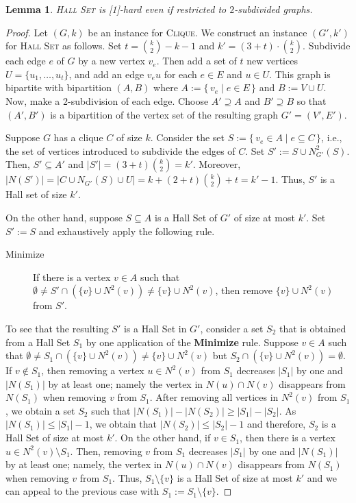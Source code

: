 \documentclass[10pt,usletter]{article}
\newcommand{\SB}{\{\,}\newcommand{\SM}{\;{|}\;}\newcommand{\SE}{\,\}}
\newcommand{\W}[1][xxxx]{\text{\normalfont W}[#1]}
\newcommand{\HS}{\textsc{Hall Set}\xspace}
\newcommand{\CLIQUE}{\textsc{Clique}\xspace}
\newtheorem{lemma}[theorem]{Lemma}
\begin{document}
\begin{lemma}\label{lem:h2}
 \HS is {\rm \W[1]}-hard even if restricted to $2$-subdivided graphs. \end{lemma}
\begin{proof}
Let $(G,k)$ be an instance for \CLIQUE. We construct an instance $(G',k')$ for \HS as follows.
Set $t=\binom{k}{2}-k-1$ and $k'=(3+t) \cdot \binom{k}{2}$.
Subdivide each edge $e$ of $G$ by a new vertex $v_e$. Then add a set of $t$ new vertices $U=\{u_1, \dots, u_t\}$,
and add an edge $v_eu$ for each $e\in E$ and $u\in U$. This graph is bipartite with bipartition $(A,B)$ where
$A:=\SB v_e \SM e\in E\SE$ and $B:=V\cup U$. Now, make a 2-subdivision of each edge.
Choose $A'\supseteq A$ and $B'\supseteq B$ so that $(A',B')$ is a bipartition of the vertex set of the resulting graph $G'=(V',E')$.

Suppose $G$ has a clique $C$ of size $k$. Consider the set $S := \SB
v_e\in A \SM e \subseteq C \SE$, i.e., the set of vertices introduced
to subdivide the edges of $C$. Set $S' := S\cup N^2_{G'}(S)$. Then, $S' \subseteq A'$ and $|S'| = (3+t)\binom{k}{2} = k'$.
Moreover, $|N(S')| = |C \cup N_{G'}(S) \cup U| = k+(2+t) \binom{k}{2}+t = k'-1$. Thus, $S'$ is a
Hall set of size $k'$.

\smallskip

On the other hand, suppose $S \subseteq A$ is a Hall Set of $G'$ of size at most $k'$.
Set $S':=S$ and exhaustively apply the following rule.

\begin{description}
\item[Minimize] If there is a vertex $v\in A$ such that $\emptyset \neq S' \cap (\{v\}\cup N^2(v)) \neq \{v\}\cup N^2(v)$,
 then remove $\{v\}\cup N^2(v)$ from $S'$.
\end{description}

To see that the resulting $S'$ is a Hall Set in $G'$, consider a set $S_2$ that is obtained from a Hall Set $S_1$ by one application
of the \textbf{Minimize} rule. Suppose $v\in A$ such that $\emptyset \neq S_1 \cap (\{v\}\cup N^2(v)) \neq \{v\}\cup N^2(v)$ but
$S_2 \cap (\{v\}\cup N^2(v)) = \emptyset$. If $v\notin S_1$, then removing a vertex $u\in N^2(v)$ from $S_1$
decreases $|S_1|$ by one and $|N(S_1)|$ by at least one; namely the vertex in $N(u)\cap N(v)$ disappears from
$N(S_1)$ when removing $v$ from $S_1$. After removing all vertices in $N^2(v)$ from $S_1$, we obtain a set $S_2$
such that $|N(S_1)|-|N(S_2)| \ge |S_1|-|S_2|$. As $|N(S_1)|\le |S_1|-1$, we obtain that $|N(S_2)| \le |S_2|-1$ and therefore,
$S_2$ is a Hall Set of size at most $k'$. On the other hand, if $v\in S_1$, then there is a vertex $u\in N^2(v)\setminus S_1$.
Then, removing $v$ from $S_1$ decreases $|S_1|$ by one and $|N(S_1)|$ by at least one; namely, the vertex in
$N(u)\cap N(v)$ disappears from $N(S_1)$ when removing $v$ from $S_1$. Thus, $S_1\setminus \{v\}$ is a Hall Set
of size at most $k'$ and we can appeal to the previous case with $S_1:=S_1\setminus \{v\}$.


\end{proof}
\end{document}
